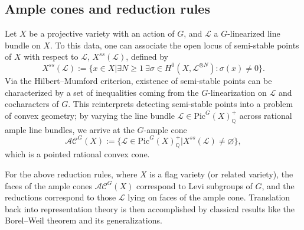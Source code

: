 \documentclass[12pt,reqno]{amsart}
\theoremstyle{definition}
\begin{document}



\subsection{Ample cones and reduction rules}

Let $X$ be a projective variety with an action of $G$, and $\mathcal{L}$ a $G$-linearized line bundle on $X$. To this data, one can associate the open locus of semi-stable points of $X$ with respect to $\mathcal{L}$, $X^{ss}(\mathcal{L})$, defined by 
$$
X^{ss}(\mathcal{L}):=\{x \in X | \exists N \geq 1 \ \exists \sigma \in H^0(X, \mathcal{L}^{\otimes N}): \sigma(x) \neq 0\}.
$$
Via the Hilbert--Mumford criterion, existence of semi-stable points can be characterized by a set of inequalities coming from the $G$-linearization on $\mathcal{L}$ and cocharacters of $G$. This reinterprets detecting semi-stable points into a problem of convex geometry; by varying the line bundle $\mathcal{L} \in \mathrm{Pic}^G(X)^+_\mathbb{Q}$ across rational ample line bundles, we arrive at the $G$-ample cone 
$$
\mathcal{AC}^G(X):= \{ \mathcal{L} \in \mathrm{Pic}^G(X)^+_\mathbb{Q} | X^{ss}(\mathcal{L}) \neq \varnothing \}, 
$$
which is a pointed rational convex cone. 

For the above reduction rules, where $X$ is a flag variety (or related variety), the faces of the ample cones $\mathcal{AC}^G(X)$ correspond to Levi subgroups of $G$, and the reductions correspond to those $\mathcal{L}$ lying on faces of the ample cone. Translation back into representation theory is then accomplished by classical results like the Borel--Weil theorem and its generalizations.
\end{document}
